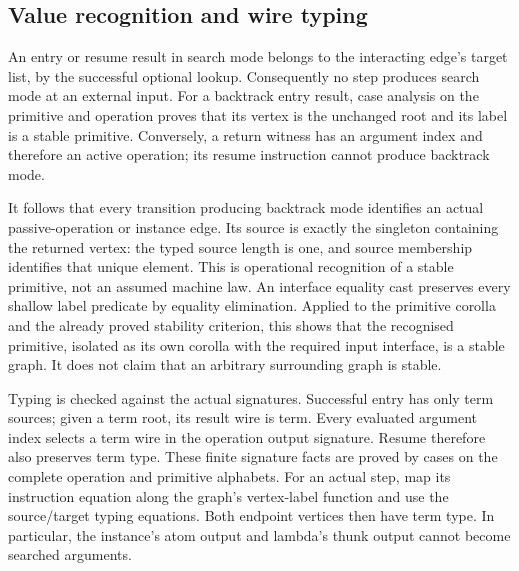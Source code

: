 \subsection{Value recognition and wire typing}

An entry or resume result in search mode belongs to the interacting edge's
target list, by the successful optional lookup. Consequently no step produces
search mode at an external input. For a backtrack entry result, case analysis
on the primitive and operation proves that its vertex is the unchanged root
and its label is a stable primitive. Conversely, a return witness has an
argument index and therefore an active operation; its resume instruction
cannot produce backtrack mode.







It follows that every transition producing backtrack mode identifies an
actual passive-operation or instance edge. Its source is exactly the singleton
containing the returned vertex: the typed source length is one, and source
membership identifies that unique element. This is operational recognition of
a stable primitive, not an assumed machine law.
An interface equality cast preserves every shallow label predicate by equality
elimination. Applied to the primitive corolla and the already proved stability
criterion, this shows that the recognised primitive, isolated as its own
corolla with the required input interface, is a stable graph. It does not
claim that an arbitrary surrounding graph is stable.




Typing is checked against the actual signatures. Successful entry has
only term sources; given a term root, its result wire is term. Every evaluated
argument index selects a term wire in the operation output signature. Resume
therefore also preserves term type. These finite signature facts are proved
by cases on the complete operation and primitive alphabets. For an actual
step, map its instruction equation along the graph's vertex-label function
and use the source/target typing equations. Both endpoint vertices then have
term type. In particular, the instance's atom output and lambda's thunk output
cannot become searched arguments.

